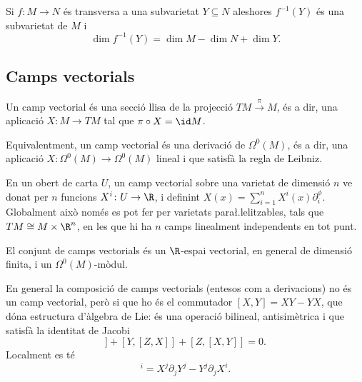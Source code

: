 \documentclass[12pt,twocolumn]{article}
\begin{document}
\begin{theorem}
	Si \( f \colon M \to N \) és transversa a una subvarietat \( Y \subseteq N \) aleshores
	\( f^{-1}(Y) \) és una subvarietat de \( M \) i
	\begin{equation*}
		\dim f^{-1}(Y) = \dim M - \dim N + \dim Y.
	\end{equation*}
\end{theorem}

\subsection{Camps vectorials}
\begin{definition}
	Un camp vectorial és una secció llisa de la projecció \( TM \xrightarrow{\pi} M \), és a
	dir, una aplicació \( X \colon M \to TM \) tal que \( \pi \circ X = \id M \).
	
	Equivalentment, un camp vectorial és una derivació de \( \Omega^0(M) \), és a dir, una
	aplicació \( X \colon \Omega^0(M) \to \Omega^0(M) \) lineal i que satisfà la regla de
	Leibniz. 
\end{definition}
\begin{observation}
	\begin{points}
	\item En un obert de carta \( U \), un camp vectorial sobre una varietat de dimensió \(
		n \) ve donat per \( n \) funcions \( X^i \colon U \to \R \), i definint \( X(x) =
		\sum_{i = 1}^{n} X^i(x) \partial^\phi_i \). Globalment això només es pot fer per
		varietats para\l.lelitzables, tals que \( TM \cong M \times \R^n \), en les que hi ha
		\( n \) camps linealment independents en tot punt. 
	\item El conjunt de camps vectorials és un \( \R \)-espai vectorial, en general de
		dimensió finita, i un	\( \Omega^0(M) \)-mòdul.

	\item En general la composició de camps vectorials (entesos com a derivacions) no és un
		camp vectorial, però si que ho és el commutador \( [X,Y] = XY - YX \), que dóna
		estructura d'àlgebra de Lie: és una operació bilineal, antisimètrica i que satisfà la
		identitat de Jacobi
		\begin{equation*}
			[X,[Y,Z]] + [Y,[Z,X]] + [Z,[X,Y]] = 0.
		\end{equation*}
		Localment es té
		\begin{equation*}
			[X,Y]^i = X^j \partial_j Y^j - Y^j \partial_j X^i.
		\end{equation*}
	\end{points}
\end{observation}
\end{document}
